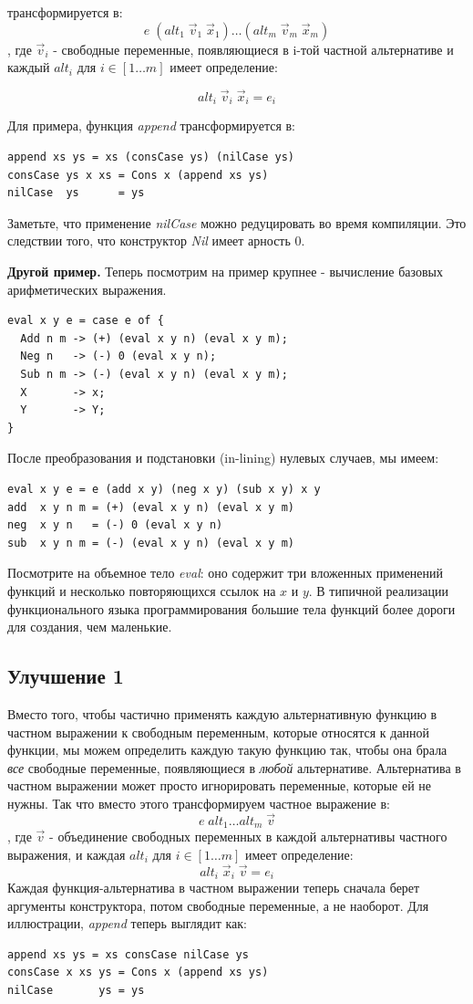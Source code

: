 \documentclass[flenqn, 14pt]{extarticle}
\begin{document}
трансформируется в:
$$
e \; (alt_1 \;  \vec{v}_1 \; \vec{x}_1 ) \ldots (alt_m \;  \vec{v}_m \; \vec{x}_m )
$$
, где $\vec{v}_i$ - свободные переменные, появляющиеся в i-той частной альтернативе и каждый $alt_i$ для $i \in [1 \ldots m]$ имеет определение:

$$
	alt_i \; \vec{v}_i \; \vec{x}_i = e_i
$$

Для примера, функция \textit{append} трансформируется в:
\begin{verbatim}
append xs ys = xs (consCase ys) (nilCase ys)
consCase ys x xs = Cons x (append xs ys)
nilCase  ys      = ys
\end{verbatim}

Заметьте, что применение \textit{nilCase} можно редуцировать во время компиляции. Это следствии того, что конструктор \textit{Nil} имеет арность 0.

\textbf{Другой пример.} Теперь посмотрим на пример крупнее - вычисление базовых арифметических выражения.
\begin{verbatim}
eval x y e = case e of {
  Add n m -> (+) (eval x y n) (eval x y m);
  Neg n   -> (-) 0 (eval x y n);
  Sub n m -> (-) (eval x y n) (eval x y m);
  X       -> x;
  Y       -> Y;
}
\end{verbatim}

После преобразования и подстановки (in-lining) нулевых случаев, мы имеем:
\begin{verbatim}
eval x y e = e (add x y) (neg x y) (sub x y) x y
add  x y n m = (+) (eval x y n) (eval x y m)
neg  x y n   = (-) 0 (eval x y n)
sub  x y n m = (-) (eval x y n) (eval x y m)
\end{verbatim}

Посмотрите на объемное тело \textit{eval}: оно содержит три вложенных применений функций и несколько повторяющихся ссылок на $x$ и $y$. В типичной реализации функционального языка программирования большие тела функций более дороги для создания, чем маленькие.

\subsection*{Улучшение 1} 
Вместо того, чтобы частично применять каждую альтернативную функцию в частном выражении к свободным переменным, которые относятся к данной функции, мы можем определить каждую такую функцию так, чтобы она брала \textit{все} свободные переменные, появляющиеся в \textit{любой} альтернативе. Альтернатива в частном выражении может просто игнорировать переменные, которые ей не нужны. Так что вместо этого трансформируем частное выражение в:
$$
e \; alt_1 \ldots alt_m \; \vec{v}
$$ 
, где $\overrightarrow{v}$ - объединение свободных переменных в каждой альтернативы частного выражения, и каждая $alt_i$ для $i \in [1\ldots m]$ имеет определение:
$$
alt_i \; \vec{x}_i \; \vec{v} = e_i
$$
Каждая функция-альтернатива в частном выражении теперь сначала берет аргументы конструктора, потом свободные переменные, а не наоборот. Для иллюстрации, \textit{append} теперь выглядит как:
\begin{verbatim}
append xs ys = xs consCase nilCase ys
consCase x xs ys = Cons x (append xs ys)
nilCase       ys = ys
\end{verbatim}
\end{document}
